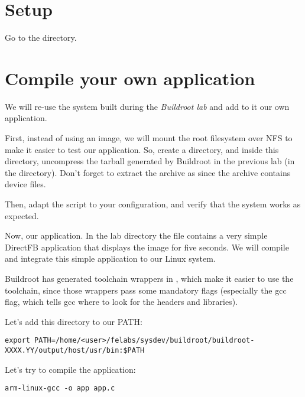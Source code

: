 
\section{Setup}

Go to the  directory.

\section{Compile your own application}

We will re-use the system built during the {\em Buildroot lab} and add
to it our own application.

First, instead of using an  image, we will mount the root
filesystem over NFS to make it easier to test our application. So,
create a  directory, and inside this directory,
uncompress the tarball generated by Buildroot in the previous lab (in
the  directory). Don't forget to extract the
archive as  since the archive contains device files.

Then, adapt the  script to your configuration, and
verify that the system works as expected.

Now, our application. In the lab directory the file 
contains a very simple DirectFB application that displays the
 image for five seconds. We will compile and
integrate this simple application to our Linux system.

Buildroot has generated toolchain wrappers in
, which make it easier to use the toolchain,
since those wrappers pass some mandatory flags (especially the
 gcc flag, which tells gcc where to look for the
headers and libraries).

Let's add this directory to our PATH:

\footnotesize
\begin{verbatim}
export PATH=/home/<user>/felabs/sysdev/buildroot/buildroot-XXXX.YY/output/host/usr/bin:$PATH
\end{verbatim}
\normalsize

Let's try to compile the application:

\begin{verbatim}
arm-linux-gcc -o app app.c
\end{verbatim}

